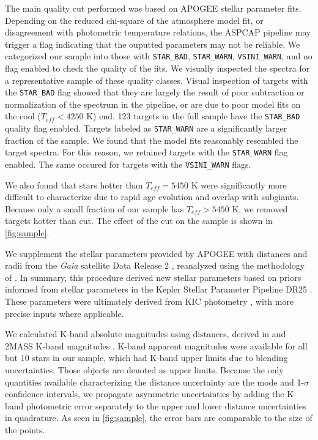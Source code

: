 \documentclass[manuscript]{aastex6}
\newcommand{\Gaia}{\mbox{\textit{Gaia}}}
\newcommand{\Teff}{\ensuremath{T_{eff}}}
\newcommand{\STARBAD}{\texttt{STAR\_BAD}}
\newcommand{\STARWARN}{\texttt{STAR\_WARN}}
\newcommand{\VSINIWARN}{\texttt{VSINI\_WARN}}
\begin{document}
The main quality cut performed was based on APOGEE stellar parameter fits.
Depending on the reduced chi-square of the atmosphere model fit, or
disagreement with photometric temperature relations, the ASPCAP pipeline
may trigger a flag indicating that the ouputted parameters may not be
reliable. We categorized our sample into those with \STARBAD, \STARWARN,
\VSINIWARN{}, and no flag enabled to check the quality of the fits. We
visually inspected the spectra for a representative sample of these
quality classes. 
Visual inspection of targets with the \STARBAD{} flag showed that they are 
largely the result of poor subtraction or normalization of the spectrum in the
pipeline, or are due to poor model fits on the cool (\(\Teff < 4250\) K) end. 
123 targets in the full sample have the \STARBAD{} quality flag enabled. 
Targets labeled as \STARWARN{} are a significantly larger fraction of the 
sample. We found that the model fits reasonably resembled the target spectra. 
For this reason, we retained targets with the \STARWARN{} flag enabled. The 
same occured for targets with the \VSINIWARN{} flags.

We also found that stars hotter than
\(\Teff = 5450\) K were significantly more difficult to characterize due to
rapid age evolution and overlap with subgiants. Because only a small 
fraction of our sample has \(\Teff > 5450\) K, we removed targets hotter
than cut. The effect of the cut on the sample is shown in \cref{fig:sample}.

We supplement the stellar parameters provided by APOGEE with distances and radii from the 
\Gaia{} satellite \citep{Gaia16} Data Release 2 \citep{Gaia18}, reanalyzed 
using the methodology of \citet{Huber14} \citep{Berger18b}. In summary, this
procedure derived new stellar parameters based on priors informed from stellar
parameters in the Kepler Stellar Parameter Pipeline DR25 \citep{Mathur17}.
These parameters were ultimately derived from KIC photometry \citep{Brown11},
with more precise inputs where applicable.

We calculated K-band absolute magnitudes using distances, derived in
\citet{Berger18b} and 2MASS K-band magnitudes \citep{Skrutskie06}. K-band 
apparent magnitudes were
available for all but 10 stars in our sample, which had K-band upper limits due
to blending uncertainties. Those objects are denoted as upper limits. Because
the only quantities available characterizing the distance uncertainty are the
mode and 1-\(\sigma\) confidence intervals, we propagate asymmetric
uncertainties by adding the K-band photometric error separately to the upper
and lower distance uncertainties in quadrature. As seen in \cref{fig:sample},
the error bars are comparable to the size of the points.
\end{document}
